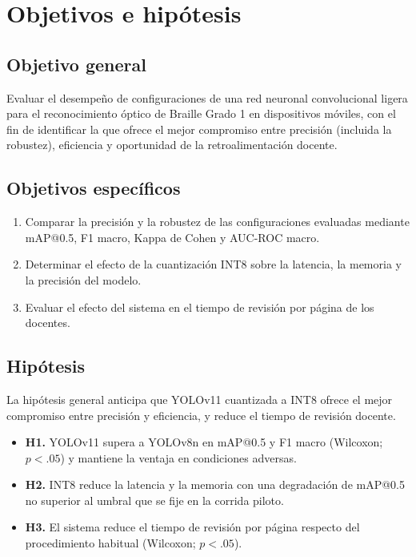 \section{Objetivos e hipótesis}

\subsection{Objetivo general}
Evaluar el desempeño de configuraciones de una red neuronal convolucional ligera
para el reconocimiento óptico de Braille Grado 1 en dispositivos móviles, con el
fin de identificar la que ofrece el mejor compromiso entre precisión (incluida la
robustez), eficiencia y oportunidad de la retroalimentación docente.

\subsection{Objetivos específicos}
\begin{enumerate}
  \item Comparar la precisión y la robustez de las configuraciones evaluadas
  mediante mAP@0.5, F1 macro, Kappa de Cohen y AUC-ROC macro.
  \item Determinar el efecto de la cuantización INT8 sobre la latencia, la
  memoria y la precisión del modelo.
  \item Evaluar el efecto del sistema en el tiempo de revisión por página de los
  docentes.
\end{enumerate}

\subsection{Hipótesis}
La hipótesis general anticipa que YOLOv11 cuantizada a INT8 ofrece el mejor
compromiso entre precisión y eficiencia, y reduce el tiempo de revisión docente.

\begin{itemize}
  \item \textbf{H1.} YOLOv11 supera a YOLOv8n en mAP@0.5 y F1 macro (Wilcoxon;
  $p < .05$) y mantiene la ventaja en condiciones adversas.
  \item \textbf{H2.} INT8 reduce la latencia y la memoria con una degradación de
  mAP@0.5 no superior al umbral que se fije en la corrida piloto.
  \item \textbf{H3.} El sistema reduce el tiempo de revisión por página respecto
  del procedimiento habitual (Wilcoxon; $p < .05$).
\end{itemize}
